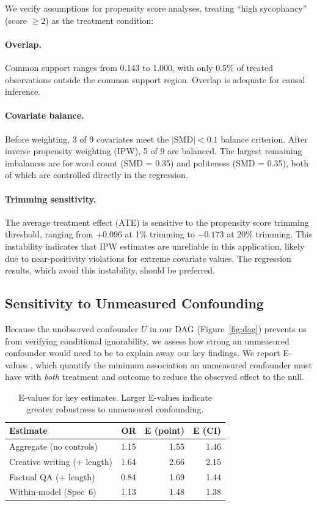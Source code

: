 \documentclass[11pt,twocolumn,a4paper]{article}
\begin{document}
We verify assumptions for propensity score analyses, treating ``high
sycophancy'' (score $\geq 2$) as the treatment condition:

\paragraph{Overlap.} Common support ranges from 0.143 to 1.000, with
only 0.5\% of treated observations outside the common support region.
Overlap is adequate for causal inference.

\paragraph{Covariate balance.} Before weighting, 3 of 9 covariates
meet the $|\text{SMD}| < 0.1$ balance criterion. After inverse
propensity weighting (IPW), 5 of 9 are balanced. The largest
remaining imbalances are for word count (SMD = 0.35) and politeness
(SMD = 0.35), both of which are controlled directly in the regression.

\paragraph{Trimming sensitivity.} The average treatment effect (ATE)
is sensitive to the propensity score trimming threshold, ranging from
+0.096 at 1\% trimming to $-0.173$ at 20\% trimming. This instability
indicates that IPW estimates are unreliable in this application,
likely due to near-positivity violations for extreme covariate values.
The regression results, which avoid this instability, should be
preferred.

\subsection{Sensitivity to Unmeasured Confounding}
\label{sec:sensitivity}

Because the unobserved confounder $U$ in our DAG
(Figure~\ref{fig:dag}) prevents us from verifying conditional
ignorability, we assess how strong an unmeasured confounder would need
to be to explain away our key findings. We report E-values
\citep{vanderweele2017sensitivity}, which quantify the minimum
association an unmeasured confounder must have with \emph{both}
treatment and outcome to reduce the observed effect to the null.

\begin{table}[ht]
  \centering
  \caption{E-values for key estimates. Larger E-values indicate
    greater robustness to unmeasured confounding.}
  \label{tab:evalues}
  \begin{tabular}{lrrr}
    \toprule
    Estimate & OR & E (point) & E (CI) \\
    \midrule
    Aggregate (no controls) & 1.15 & 1.55 & 1.46 \\
    Creative writing (+ length) & 1.64 & 2.66 & 2.15 \\
    Factual QA (+ length) & 0.84 & 1.69 & 1.44 \\
    Within-model (Spec~6) & 1.13 & 1.48 & 1.38 \\
    \bottomrule
  \end{tabular}
\end{table}
\end{document}
